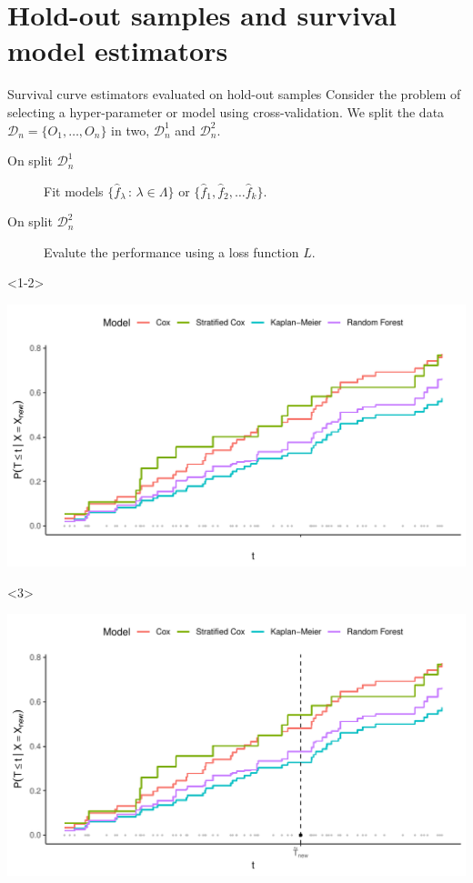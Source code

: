 \documentclass[smaller]{beamer}\usepackage{listings}
\begin{document}
\section{Hold-out samples and survival model estimators}
\label{sec:org500be4f}
\begin{frame}[label={sec:org6bf0f5d}]{Survival curve estimators evaluated on hold-out samples}
\small Consider the problem of selecting a hyper-parameter or model using cross-validation.
We split the data \(\mathcal{D}_n = \{O_1, \dots, O_n\}\) in two, \(\mathcal{D}_n^1\) and \(\mathcal{D}_n^2\).
\begin{description}
\item[{On split \(\mathcal{D}_n^1\)}] Fit models \(\{\hat f_{\lambda} \, : \, \lambda \in \Lambda\}\) or
\(\{\hat f_1, \hat f_2, \dots \hat f_k\}\).
\item[{On split \(\mathcal{D}_n^2\)}] Evalute the performance using a loss function \(L\).
\end{description}

\begin{onlyenv}<1-2>
\pause

\begin{center}
\includegraphics[width=.9\linewidth]{fig-hold-out-sample.pdf}
\end{center}
\end{onlyenv}

\begin{onlyenv}<3>
\begin{center}
\includegraphics[width=.9\linewidth]{fig-hold-out-sample2.pdf}
\end{center}
\end{onlyenv}
\end{frame}
\end{document}
